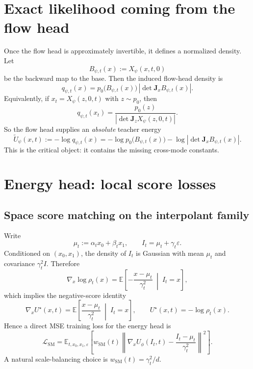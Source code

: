 \documentclass[11pt]{article}
\newcommand{\E}{\mathbb{E}}
\newcommand{\abs}[1]{\left| #1 \right|}
\newcommand{\grad}{\nabla}
\newcommand{\J}{\mathbf{J}}
\newcommand{\flow}{X_{\psi}}
\newcommand{\energy}{U_{\phi}}
\begin{document}
\section{Exact likelihood coming from the flow head}

Once the flow head is approximately invertible, it defines a normalized density. Let
\begin{equation}
B_{\psi,t}(x) := \flow(x,t,0)
\label{eq:backward_map}
\end{equation}
be the backward map to the base. Then the induced flow-head density is
\begin{equation}
q_{\psi,t}(x) = p_0\big(B_{\psi,t}(x)\big)
\,\abs{\det \J_x B_{\psi,t}(x)}.
\label{eq:flow_density_inverse}
\end{equation}
Equivalently, if $x_t = \flow(z,0,t)$ with $z \sim p_0$, then
\begin{equation}
q_{\psi,t}(x_t)
=
\frac{p_0(z)}{\abs{\det \J_z \flow(z,0,t)}}.
\label{eq:flow_density_forward}
\end{equation}
So the flow head supplies an \emph{absolute} teacher energy
\begin{equation}
\widetilde U_{\psi}(x,t)
:= -\log q_{\psi,t}(x)
= -\log p_0\big(B_{\psi,t}(x)\big) - \log \abs{\det \J_x B_{\psi,t}(x)}.
\label{eq:teacher_energy_exact}
\end{equation}
This is the critical object: it contains the missing cross-mode constants.

\section{Energy head: local score losses}

\subsection{Space score matching on the interpolant family}

Write
\begin{equation}
\mu_t := \alpha_t x_0 + \beta_t x_1,
\qquad I_t = \mu_t + \gamma_t \varepsilon.
\label{eq:mu_t}
\end{equation}
Conditioned on $(x_0,x_1)$, the density of $I_t$ is Gaussian with mean $\mu_t$ and covariance $\gamma_t^2 I$. Therefore
\begin{equation}
\grad_x \log \rho_t(x)
=
\E\left[
-\frac{x-\mu_t}{\gamma_t^2}
\;\middle|\; I_t=x
\right],
\label{eq:score_identity}
\end{equation}
which implies the negative-score identity
\begin{equation}
\grad_x U^{\star}(x,t)
=
\E\left[
\frac{x-\mu_t}{\gamma_t^2}
\;\middle|\; I_t=x
\right],
\qquad U^{\star}(x,t)=-\log \rho_t(x).
\label{eq:negative_score_identity}
\end{equation}
Hence a direct MSE training loss for the energy head is
\begin{equation}
\mathcal{L}_{\mathrm{SM}}
=
\E_{t,x_0,x_1,\varepsilon}
\left[
 w_{\mathrm{SM}}(t)
\left\|
\grad_x \energy(I_t,t) - \frac{I_t-\mu_t}{\gamma_t^2}
\right\|^2
\right].
\label{eq:L_SM}
\end{equation}
A natural scale-balancing choice is $w_{\mathrm{SM}}(t)=\gamma_t^2/d$.
\end{document}

